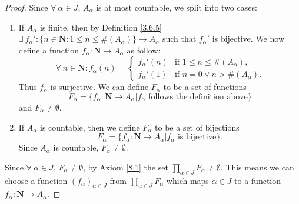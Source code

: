 \begin{proof}
    Since \(\forall\ \alpha \in J\), \(A_{\alpha}\) is at most countable, we split into two cases:
    \begin{enumerate}
        \item If \(A_{\alpha}\) is finite, then by Definition \ref{3.6.5} \(\exists\ f_{\alpha}' : \{n \in \mathbf{N} : 1 \leq n \leq \#(A_{\alpha})\} \to A_{\alpha}\) such that \(f_{\alpha}'\) is bijective.
              We now define a function \(f_{\alpha} : \mathbf{N} \to A_{\alpha}\) as follow:
              \[
                  \forall\ n \in \mathbf{N} : f_{\alpha}(n) = \begin{cases}
                      f_{\alpha}'(n) & \text{if } 1 \leq n \leq \#(A_{\alpha}),  \\
                      f_{\alpha}'(1) & \text{if } n = 0 \lor n > \#(A_{\alpha}).
                  \end{cases}
              \]
              Thus \(f_{\alpha}\) is surjective.
              We can define \(F_{\alpha}\) to be a set of functions
              \[
                  F_{\alpha} = \{f_{\alpha} : \mathbf{N} \to A_{\alpha} | f_{\alpha} \text{ follows the definition above}\}
              \]
              and \(F_{\alpha} \neq \emptyset\).
        \item If \(A_{\alpha}\) is countable, then we define \(F_{\alpha}\) to be a set of bijections
              \[
                  F_{\alpha} = \{f_{\alpha} : \mathbf{N} \to A_{\alpha} | f_{\alpha} \text{ is bijective}\}.
              \]
              Since \(A_{\alpha}\) is countable, \(F_{\alpha} \neq \emptyset\).
    \end{enumerate}
    Since \(\forall\ \alpha \in J\), \(F_{\alpha} \neq \emptyset\), by Axiom \ref{8.1} the set \(\prod_{\alpha \in J} F_{\alpha} \neq \emptyset\).
    This means we can choose a function \((f_{\alpha})_{\alpha \in J}\) from \(\prod_{\alpha \in J} F_{\alpha}\) which maps \(\alpha \in J\) to a function \(f_{\alpha} : \mathbf{N} \to A_{\alpha}\).


\end{proof}
